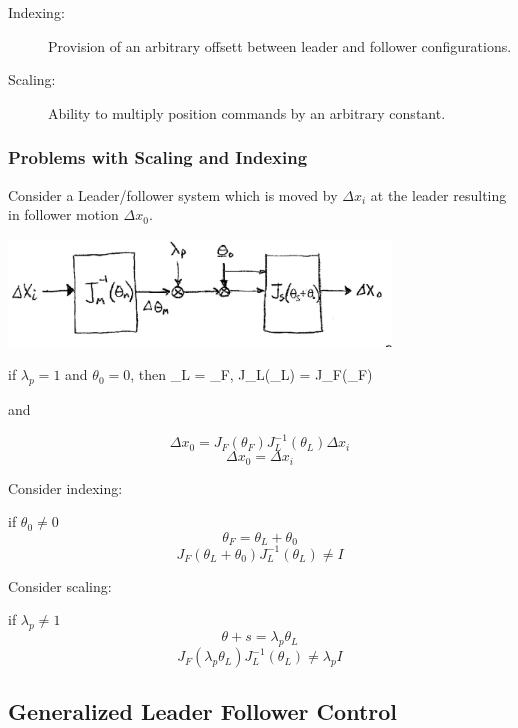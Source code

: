 \begin{description}
\item [Indexing:] Provision of an arbitrary offsett between leader and follower configurations.
\item [Scaling:]  Ability to multiply position commands by an arbitrary constant.
\end{description}


\subsubsection{Problems with Scaling and Indexing}
Consider a Leader/follower system which is moved by $\Delta x_i$ at the leader resulting in follower motion $\Delta x_0$.

\includegraphics[width=4.0in]{figs14/00402.eps}


if $\lambda_p =1$ and $\theta_0 = 0$, then
\bq
\theta_L = \theta_F, J_L(\theta_L) = J_F(\theta_F)
\eq

and

\[
\Delta x_0 = J_F(\theta_F)J^{-1}_L(\theta_L)\Delta x_i
\]
\[
\Delta x_0 = \Delta x_i
\]


Consider indexing:

if $\theta_0 \ne 0$
\[
\theta_F = \theta_L + \theta_0
\]
\[
J_F(\theta_L+\theta_0)J^{-1}_L(\theta_L) \ne I
\]


Consider scaling:

if $\lambda_p \ne 1$
\[
\theta+s = \lambda_p\theta_L
\]
\[
J_F(\lambda_p\theta_L)J^{-1}_L(\theta_L) \ne \lambda_p I
\]




\subsection{Generalized Leader Follower Control}

